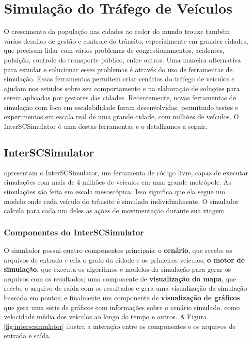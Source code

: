 {\section{Simulação do Tráfego de Veículos}

  O crescimento da população nas cidades ao redor do mundo trouxe também vários
desafios de gestão e controle do trânsito, especialmente em grandes cidades,
que precisam lidar com vários problemas de congestionamentos, acidentes,
poluição, controle do transporte público, entre outros. Uma maneira alternativa
para estudar e solucionar esses problemas é através do uso de ferramentas de
simulação. Essas ferramentas permitem criar cenários do tráfego de veículos e
ajudam nos estudos sobre seu comportamento e na elaboração de soluções para
serem aplicadas por gestores das cidades. Recentemente, novas ferramentas de
simulação com foco em escalabilidade foram desenvolvidas, permitindo testes e
experimentos em escala real de uma grande cidade, com milhões de veículos. O
InterSCSimulator é uma destas ferramentas e o detalhamos a seguir.

\subsection{InterSCSimulator}
\label{sec:interscsimulator}

\citet{mabs2017} apresentam o InterSCSimulator, um ferramenta de código livre,
capaz de executar simulações com mais de 4 milhões de veículos em uma grande
metrópole.  As simulações são feita em escala mesoscópica. Isso significa que
ela segue um modelo onde cada veículo do trânsito é simulado individualmente. O
simulador calcula para cada um deles as ações de movimentação durante sua
viagem.

\subsubsection{Componentes do InterSCSimulator}

  O simulador possui quatro componentes principais: o \textbf{cenário}, que
recebe os arquivos de entrada e cria o grafo da cidade e os primeiros veículos;
\textbf{o motor de simulação}, que executa os algoritmos e modelos da simulação
para gerar os arquivos com os resultados; uma componente de
\textbf{visualização do mapa}, que recebe o arquivo de saída com os resultados
e gera uma visualização da simulação baseada em pontos; e finalmente um
componente de \textbf{visualização de gráficos} que gera uma série de gráficos
com informações sobre o cenário simulado, como velocidade média dos veículos ao
longo do tempo e outros. A Figura \ref{fig:interscsimulator} ilustra a
interação entre os componentes e os arquivos de entrada e saída.

}

